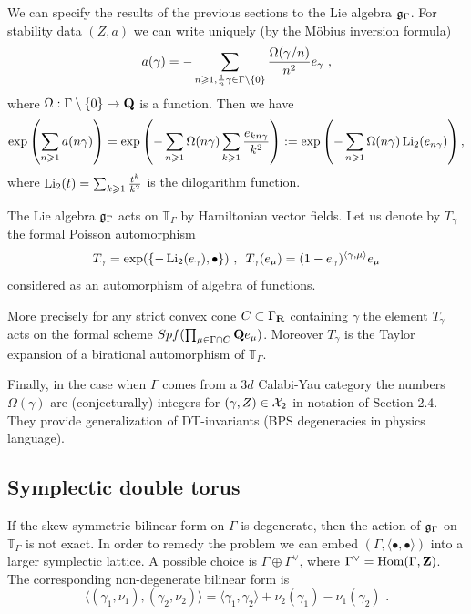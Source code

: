 \documentclass[12pt]{article}
\begin{document}
We can specify the results of the previous sections to the Lie algebra ${\mathfrak g}_{\Gamma}$.
For stability data $(Z,a)$ we can write uniquely (by the M\"obius inversion formula) 
$$a(\gamma)=-\sum_{n\geqslant 1, {1\over{n}}\gamma\in \Gamma\setminus \{0\}}{\Omega(\gamma/n)\over{n^2}}e_{\gamma}\,\,,$$
where $\Omega:\Gamma\setminus \{0\}\to {\bf Q}$ is a function. Then we have
$$\exp\left(\sum_{n\geqslant 1}a(n\gamma)\right)=\exp\left(-\sum_{n\geqslant 1} \Omega(n\gamma)\sum_{k\geqslant 1}{e_{kn\gamma}\over{k^2}}\right):=
\exp\left(-\sum_{n\geqslant 1}\Omega(n\gamma)\operatorname{Li}_2(e_{n\gamma})\right),$$
where $\operatorname{Li}_2(t)=\sum_{k\geqslant 1}{t^k\over{k^2}}$ is the dilogarithm function.

The Lie algebra ${\mathfrak g}_{\Gamma}$ acts on ${\mathbb T}_{\Gamma}$ by Hamiltonian vector fields. Let us denote by $T_{\gamma}$ the formal Poisson automorphism
$$T_{\gamma}=\exp(\{-\operatorname{Li}_2(e_{\gamma}),\bullet\})\,\,,\,\,\, T_\gamma(e_\mu)=(1-e_\gamma)^{\langle \gamma,\mu \rangle} e_\mu$$
considered as an automorphism of algebra of functions.

More precisely for any strict convex cone $C\subset \Gamma_{{\bf R}}$ containing $\gamma$ the element $T_{\gamma}$ acts on the formal scheme $Spf(\prod_{\mu\in \Gamma \cap C}{\bf Q} e_{\mu})$. Moreover $T_{\gamma}$ is the Taylor expansion of a birational automorphism of ${\mathbb T}_{\Gamma}$.

Finally, in the case when $\Gamma$ comes from a $3d$ Calabi-Yau category the numbers $\Omega(\gamma)$ are (conjecturally) integers for $(\gamma,Z)\in {\cal X}_2$ in notation of Section 2.4. They provide generalization of DT-invariants (BPS degeneracies in physics language).






\subsection{Symplectic double torus}

If the skew-symmetric bilinear form on $\Gamma$ is degenerate, then the
action of ${\mathfrak g}_{\Gamma}$ on
${\mathbb T}_{\Gamma}$ is not exact. In order to remedy the problem we can embed
$(\Gamma, \langle\bullet,\bullet\rangle)$ into a larger symplectic lattice. A possible choice is $\Gamma\oplus \Gamma^{\vee}$, where $\Gamma^{\vee}=\operatorname{Hom}(\Gamma,{\bf Z})$. The corresponding non-degenerate bilinear form is 
$$\langle(\gamma_1,\nu_1),(\gamma_2,\nu_2)\rangle=\langle \gamma_1,\gamma_2\rangle+\nu_2(\gamma_1)-\nu_1(\gamma_2)\,\,.$$
 
\end{document}
